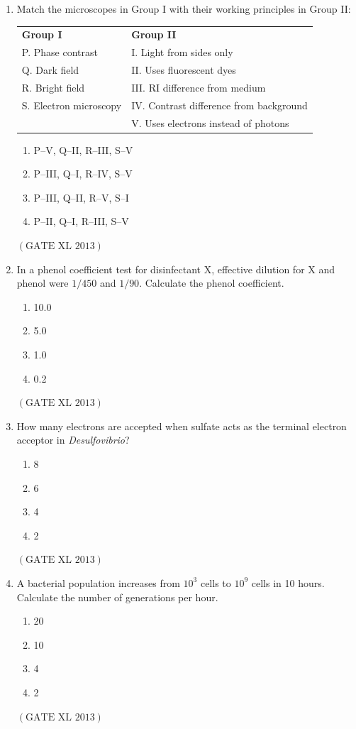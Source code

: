 \documentclass[12pt]{article}
\theoremstyle{remark}
\providecommand{\brak}[1]{\ensuremath{\left(#1\right)}}
\begin{document}
\begin{enumerate}
\item Match the microscopes in Group I with their working principles in Group II:  
\begin{tabular}{ll}
\textbf{Group I} & \textbf{Group II} \\
P. Phase contrast & I. Light from sides only \\
Q. Dark field & II. Uses fluorescent dyes \\
R. Bright field & III. RI difference from medium \\
S. Electron microscopy & IV. Contrast difference from background \\
& V. Uses electrons instead of photons \\
\end{tabular}
\begin{enumerate}
\item P–V, Q–II, R–III, S–V
\item P–III, Q–I, R–IV, S–V
\item P–III, Q–II, R–V, S–I
\item P–II, Q–I, R–III, S–V
\end{enumerate}
\hfill $\brak{\text{GATE XL 2013}}$

\item In a phenol coefficient test for disinfectant X, effective dilution for X and phenol were $1/450$ and $1/90$. Calculate the phenol coefficient.
\begin{enumerate}
\item 10.0
\item 5.0
\item 1.0
\item 0.2
\end{enumerate}
\hfill $\brak{\text{GATE XL 2013}}$

\item How many electrons are accepted when sulfate acts as the terminal electron acceptor in \textit{Desulfovibrio}?
\begin{enumerate}
\item 8
\item 6
\item 4
\item 2
\end{enumerate}
\hfill $\brak{\text{GATE XL 2013}}$

\item A bacterial population increases from $10^3$ cells to $10^9$ cells in 10 hours. Calculate the number of generations per hour.
\begin{enumerate}
\item 20
\item 10
\item 4
\item 2
\end{enumerate}
\hfill $\brak{\text{GATE XL 2013}}$
\end{enumerate}
\clearpage
\end{document}
